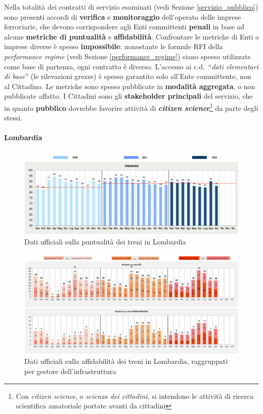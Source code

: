 \documentclass[12pt,italian]{report}
\begin{document}
Nella totalità dei contratti di servizio esaminati (vedi Sezione
\ref{servizio_pubblico}) sono presenti accordi di \textbf{verifica} e
\textbf{monitoraggio} dell'operato delle imprese ferroviarie, che
devono corrispondere agli Enti committenti \textbf{penali} in base ad
alcune \textbf{metriche di puntualità} e \textbf{affidabilità}.
Confrontare le metriche di Enti o imprese diverse è spesso
\textbf{impossibile}: nonostante le formule RFI della
\textit{performance regime} (vedi Sezione \ref{performance_regime})
siano spesso utilizzate come base di partenza, ogni contratto è
diverso.  L'accesso ai c.d.\ ``\textit{dati elementari di base}'' (le
rilevazioni grezze) è spesso garantito solo all'Ente committente, non
al Cittadino.  Le metriche sono spesso pubblicate in \textbf{modalità
    aggregata}, o non pubblicate affatto.  I Cittadini sono gli
\textbf{stakeholder principali} del servizio, che in quanto
\textbf{pubblico} dovrebbe favorire attività di
\textbf{\textit{citizen science}}\footnote{Con \textit{citizen
        science}, o \textit{scienza dei cittadini}, si intendono le
    attività di ricerca scientifica amatoriale portate avanti da
    cittadini} da parte degli stessi.

\paragraph{Lombardia}

\begin{figure}[h] \centering
    \includegraphics[width=1\textwidth]{images/lombardia_puntualita.png}
	\caption{Dati ufficiali sulla puntualità dei treni in Lombardia
        \cite{LombardiaDati}}
    \label{lombardia_puntualita}
\end{figure}

\begin{figure}[h] \centering
    \includegraphics[width=\linewidth]{images/lombardia_affidabilita.png}
    \caption{Dati ufficiali sulla affidabilità dei treni in Lombardia,
        raggruppati per gestore dell'infrastruttura
        \cite{LombardiaDati}}
    \label{lombardia_affidabilita}
\end{figure}
\end{document}
